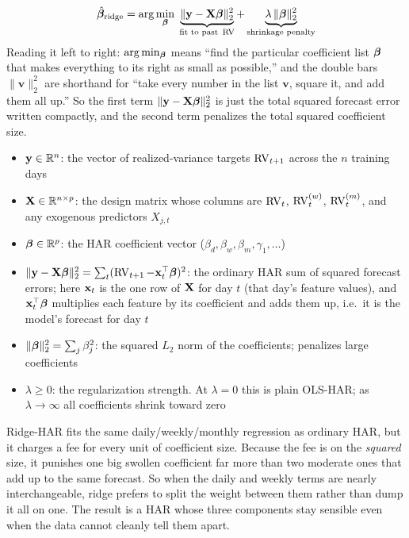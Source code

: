\begin{equation}
  \hat{\bm{\beta}}_{\mathrm{ridge}} = \arg\min_{\bm{\beta}}\;
  \underbrace{\lVert \mathbf{y} - \mathbf{X}\bm{\beta} \rVert_2^2}_{\text{fit to past }\operatorname{RV}}
  + \underbrace{\lambda\,\lVert \bm{\beta} \rVert_2^2}_{\text{shrinkage penalty}}
  \label{eq:ridge-har-objective}
\end{equation}
Reading it left to right: $\arg\min_{\bm{\beta}}$ means ``find the particular coefficient list $\bm{\beta}$ that makes everything to its right as small as possible,'' and the double bars $\lVert\mathbf{v}\rVert_2^2$ are shorthand for ``take every number in the list $\mathbf{v}$, square it, and add them all up.''
So the first term $\lVert\mathbf{y} - \mathbf{X}\bm{\beta}\rVert_2^2$ is just the total squared forecast error written compactly, and the second term penalizes the total squared coefficient size.
\begin{itemize}[nosep]
  \item $\mathbf{y} \in \mathbb{R}^n$: the vector of realized-variance targets $\operatorname{RV}_{t+1}$ across the $n$ training days
  \item $\mathbf{X} \in \mathbb{R}^{n \times p}$: the design matrix whose columns are $\operatorname{RV}_t$, $\operatorname{RV}^{(w)}_t$, $\operatorname{RV}^{(m)}_t$, and any exogenous predictors $X_{j,t}$
  \item $\bm{\beta} \in \mathbb{R}^p$: the HAR coefficient vector ($\beta_d, \beta_w, \beta_m, \gamma_1, \ldots$)
  \item $\lVert \mathbf{y} - \mathbf{X}\bm{\beta} \rVert_2^2 = \sum_t (\operatorname{RV}_{t+1} - \mathbf{x}_t^\top\bm{\beta})^2$: the ordinary HAR sum of squared forecast errors; here $\mathbf{x}_t$ is the one row of $\mathbf{X}$ for day $t$ (that day's feature values), and $\mathbf{x}_t^\top\bm{\beta}$ multiplies each feature by its coefficient and adds them up, i.e.\ it is the model's forecast for day $t$
  \item $\lVert \bm{\beta} \rVert_2^2 = \sum_j \beta_j^2$: the squared $L_2$ norm of the coefficients; penalizes large coefficients
  \item $\lambda \geq 0$: the regularization strength. At $\lambda = 0$ this is plain OLS-HAR; as $\lambda \to \infty$ all coefficients shrink toward zero
\end{itemize}

\begin{intuition}
Ridge-HAR fits the same daily/weekly/monthly regression as ordinary HAR, but it charges a fee for every unit of coefficient size.
Because the fee is on the \emph{squared} size, it punishes one big swollen coefficient far more than two moderate ones that add up to the same forecast.
So when the daily and weekly terms are nearly interchangeable, ridge prefers to split the weight between them rather than dump it all on one.
The result is a HAR whose three components stay sensible even when the data cannot cleanly tell them apart.
\end{intuition}

